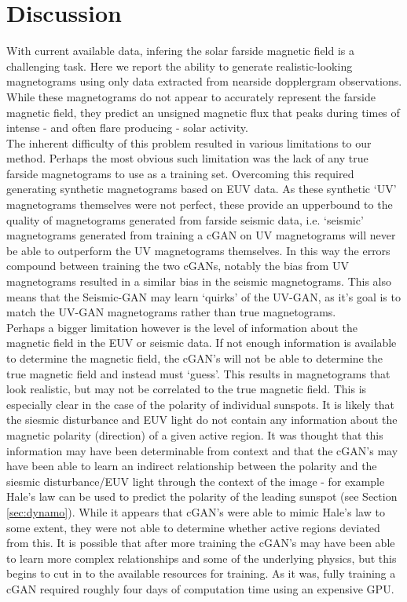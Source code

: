 \documentclass[11pt,a4paper,onecolumn]{report}
\begin{document}
%
%
%
%
%
\chapter{Discussion}
\label{chap:discussion}
%
%
%
%
%


With current available data, infering the solar farside magnetic field is a
challenging task. Here we report the ability to generate realistic-looking
magnetograms using only data extracted from nearside dopplergram observations.
While these magnetograms do not appear to accurately represent the farside
magnetic field, they predict an unsigned magnetic flux that peaks during times
of intense - and often flare producing - solar activity.\\

The inherent difficulty of this problem resulted in various limitations to our
method. Perhaps the most obvious such limitation was the lack of any true
farside magnetograms to use as a training set. Overcoming this required
generating synthetic magnetograms based on EUV data. As these synthetic `UV'
magnetograms themselves were not perfect, these provide an upperbound to the
quality of magnetograms generated from farside seismic data, i.e. `seismic'
magnetograms generated from training a cGAN on UV magnetograms will never be
able to outperform the UV magnetograms themselves.
In this way the errors compound between training the two cGANs, notably the bias
from UV magnetograms resulted in a similar bias in the seismic magnetograms.
This also means that the Seismic-GAN may learn `quirks' of the UV-GAN, as it's
goal is to match the UV-GAN magnetograms rather than true magnetograms. \\ %

Perhaps a bigger limitation however is the level of information about the
magnetic field in the EUV or seismic data. If not enough information is
available to determine the magnetic field, the cGAN's will not be able to
determine the true magnetic field and instead must `guess'. This results in
magnetograms that look realistic, but may not be correlated to the true magnetic
field. This is especially clear in the case of the polarity of individual
sunspots. It is likely that the siesmic disturbance and EUV light do not contain
any information about the magnetic polarity (direction) of a given active
region. It was thought that this information may have been determinable from
context and that the cGAN's may have been able to learn an indirect relationship
between the polarity and the siesmic disturbance/EUV light through the context
of the image - for example Hale's law can be used to predict the polarity of the
leading sunspot (see Section \ref{sec:dynamo}). While it appears that cGAN's
were able to mimic Hale's law to some extent, they were not able to determine
whether active regions deviated from this. It is possible that after more
training the cGAN's may have been able to learn more complex relationships and
some of the underlying physics, but this begins to cut in to the available
resources for training. As it was, fully training a cGAN required roughly four
days of computation time using an expensive GPU. \\
\end{document}
